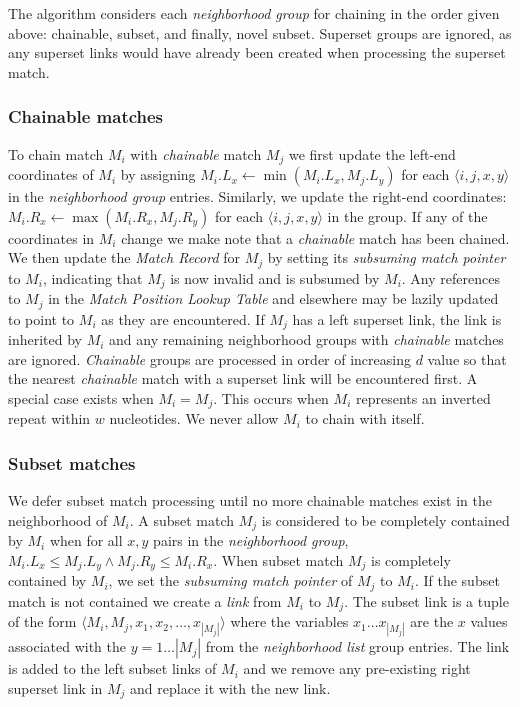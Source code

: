 \documentclass{llncs}
\begin{document}
The algorithm considers each \textit{neighborhood group} for
chaining in the order given above: chainable, subset, and finally,
novel subset.  Superset groups are ignored, as any superset links
would have already been created when processing the superset
match.

\subsubsection{Chainable matches}
To chain match $M_i$ with \textit{chainable} match $M_j$ we first
update the left-end coordinates of $M_i$ by assigning $M_i.L_x
\leftarrow \min(M_i.L_x, M_j.L_y)$ for each $\langle i, j, x,
y\rangle$ in the \textit{neighborhood group} entries. Similarly, we
update the right-end coordinates: $M_i.R_x \leftarrow \max(M_i.R_x,
M_j.R_y)$ for each $\langle i, j, x, y\rangle$ in the group.  If any
of the coordinates in $M_i$ change we make note that a
\textit{chainable} match has been chained. We then update the
\textit{Match Record} for $M_j$ by setting its \textit{subsuming
match pointer} to $M_i$, indicating that $M_j$ is now invalid and is
subsumed by $M_i$. Any references to $M_j$ in the \textit{Match
Position Lookup Table} and elsewhere may be lazily updated to point
to $M_i$ as they are encountered.  If $M_j$ has a left superset
link, the link is inherited by $M_i$ and any remaining neighborhood
groups with \textit{chainable} matches are ignored.
\textit{Chainable} groups are processed in order of increasing $d$
value so that the nearest \textit{chainable} match with a superset
link will be encountered first.  A special case exists when
$M_i=M_j$.  This occurs when $M_i$ represents an inverted repeat
within $w$ nucleotides.  We never allow $M_i$ to chain with itself.

\subsubsection{Subset matches}

We defer subset match processing until no more chainable matches
exist in the neighborhood of $M_i$. A subset match $M_j$ is
considered to be completely contained by $M_i$ when for all $x,y$
pairs in the \textit{neighborhood group}, $M_i.L_x \leq M_j.L_y
\wedge M_j.R_y \leq M_i.R_x$. When subset match $M_j$ is completely
contained by $M_i$, we set the \textit{subsuming match pointer} of
$M_j$ to $M_i$. If the subset match is not contained we create a
\textit{link} from $M_i$ to $M_j$. The subset link is a tuple of the
form $\langle M_i, M_j, x_1, x_2,\dots,x_{|M_j|}\rangle$ where the
variables $x_1 \dots x_{|M_j|}$ are the $x$ values associated with
the $y=1\dots |M_j|$ from the \textit{neighborhood list} group
entries.  The link is added to the left subset links of $M_i$ and we
remove any pre-existing right superset link in $M_j$ and replace it
with the new link.
\end{document}
